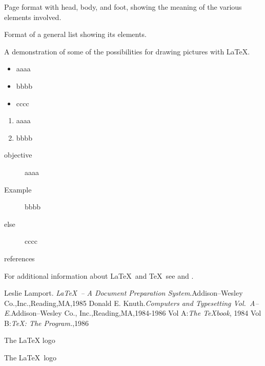\documentclass[12pt,twoside,a4paper]{article}   %
\begin{document}
	\begin{list}{\bfseries\upshape Figure :}
		{
		\setlength{\labelwidth}{2cm}\setlength{\leftmargin}{2.6cm}
		\setlength{\labelsep}{0.5cm}\setlength{\rightmargin}{1cm}
		\setlength{\parsep}{0.5ex plus0.2ex minus0.1ex}
		\setlength{\itemsep}{0ex plus0.2ex} \slshape}
		\item Page format with head, body, and foot, showing the meaning of the various elements involved.
		\item Format of a general list showing its elements.
		\item A demonstration of some of the possibilities for drawing pictures with \LaTeX.
	\end{list}
	\begin{itemize}
	\item aaaa
	\item bbbb
	\item cccc
	\end{itemize}
	\begin{enumerate}
	\item aaaa
	\item bbbb
	\end{enumerate}
	\begin{description}
	\item[objective] aaaa
	\item[Example] bbbb
	\item[else] cccc
	\end{description}
	\begin{thebibliography}{+} %
		references
	\end{thebibliography}
	\newpage
	For additional information about \LaTeX\ and \TeX\ see \cite{lamport} and \cite{knuth, knuth:a}.
	\begin{thebibliography}{99}
		 Leslie Lamport. \textsl{\LaTeX\ -- A Document Preparation System}.Addison--Wesley Co.,Inc.,Reading,MA,1985
		 Donald E. Knuth.\textsl{Computers and Typesetting Vol.\ A--E}.Addison--Wesley Co., Inc.,Reading,MA,1984-1986
		 Vol A:\textsl{The \TeX book}, 1984
		 Vol B:\textsl{\TeX: The Program.},1986
	\end{thebibliography}
	\newpage
	The \LaTeX{} logo

	The \LaTeX\ logo
\end{document}
